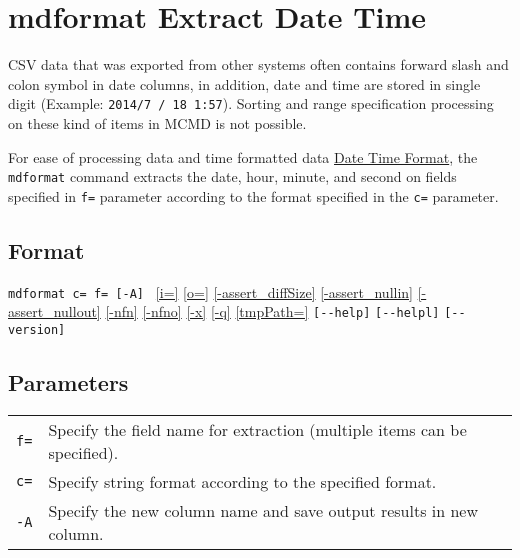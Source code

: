 
%

\section{mdformat Extract Date Time\label{sect:mdformat}}

CSV data that was exported from other systems often contains forward slash and colon symbol in  date columns, in addition, date and time are stored in single digit (Example: \verb|2014/7 / 18 1:57|). Sorting and range specification processing on these kind of items in MCMD is not possible. 

For ease of processing data and time formatted data \hyperref[sect:datetime]{Date Time Format}, the \verb|mdformat| command extracts the date, hour, minute, and second on fields specified in \verb|f=| parameter according to the format specified in the \verb|c=| parameter. 


\subsection*{Format}
\verb|mdformat c= f= [-A] | 
\hyperref[sect:option_i]{[i=]}
\hyperref[sect:option_o]{[o=]}
\hyperref[sect:option_assert_diffSize]{[-assert\_diffSize]}
\hyperref[sect:option_assert_nullin]{[-assert\_nullin]}
\hyperref[sect:option_assert_nullout]{[-assert\_nullout]}
\hyperref[sect:option_nfn]{[-nfn]} 
\hyperref[sect:option_nfno]{[-nfno]}  
\hyperref[sect:option_x]{[-x]}
\hyperref[sect:option_q]{[-q]}
\hyperref[sect:option_option_tmppath]{[tmpPath=]}
\verb|[--help]|
\verb|[--helpl]|
\verb|[--version]|\\

\subsection*{Parameters}
\begin{table}[htbp]
{\small
\begin{tabular}{ll}
\verb|f=|    & Specify the field name for extraction (multiple items can be specified). \\
\verb|c=|    & Specify string format according to the specified format. \\
\verb|-A|    & Specify the new column name and save output results in new column.  \\
\end{tabular} 
}
\end{table} 


